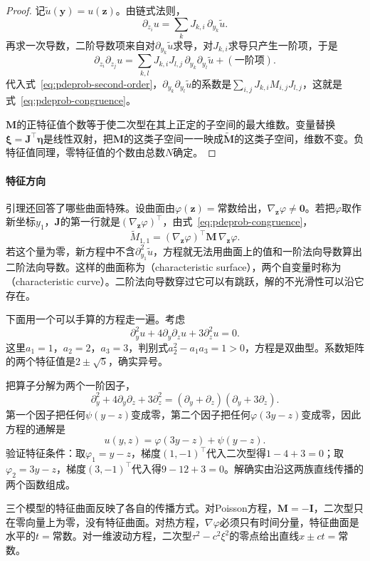 \begin{proof}
记$\widetilde{u}(\bm{y})=u(\bm{z})$。由链式法则，
\[
  \partial_{z_i}u=\sum_{k}J_{k,i}\,\partial_{y_k}\widetilde{u}.
\]
再求一次导数，二阶导数项来自对$\partial_{y_k}\widetilde{u}$求导，对$J_{k,i}$求导只产生一阶项，于是
\[
  \partial_{z_i}\partial_{z_j}u=\sum_{k,l}J_{k,i}J_{l,j}\,\partial_{y_k}\partial_{y_l}\widetilde{u}+(\text{一阶项}).
\]
代入式~\eqref{eq:pdeprob-second-order}，$\partial_{y_k}\partial_{y_l}\widetilde{u}$的系数是$\sum_{i,j}J_{k,i}M_{i,j}J_{l,j}$，这就是式~\eqref{eq:pdeprob-congruence}。

$\bm{M}$的正特征值个数等于使二次型在其上正定的子空间的最大维数。变量替换$\bm{\xi}=\bm{J}^{\top}\bm{\eta}$是线性双射，把$\bm{M}$的这类子空间一一映成$\widetilde{\bm{M}}$的这类子空间，维数不变。负特征值同理，零特征值的个数由总数$N$确定。
\end{proof}

\paragraph{特征方向}
引理还回答了哪些曲面特殊。设曲面由$\varphi(\bm{z})=$常数给出，$\nabla_{\bm{z}}\varphi\neq\bm{0}$。若把$\varphi$取作新坐标$y_1$，$\bm{J}$的第一行就是$(\nabla_{\bm{z}}\varphi)^{\top}$，由式~\eqref{eq:pdeprob-congruence}，
\[
  \widetilde{M}_{1,1}=(\nabla_{\bm{z}}\varphi)^{\top}\bm{M}\,\nabla_{\bm{z}}\varphi.
\]
若这个量为零，新方程中不含$\partial_{y_1}^{2}\widetilde{u}$，方程就无法用曲面上的值和一阶法向导数算出二阶法向导数。这样的曲面称为（characteristic surface），两个自变量时称为（characteristic curve）。二阶法向导数穿过它可以有跳跃，解的不光滑性可以沿它存在。

下面用一个可以手算的方程走一遍。考虑
\[
  \partial_y^{2}u+4\partial_y\partial_zu+3\partial_z^{2}u=0.
\]
这里$a_1=1$，$a_2=2$，$a_3=3$，判别式$a_2^{2}-a_1a_3=1>0$，方程是双曲型。系数矩阵的两个特征值是$2\pm\sqrt{5}$，确实异号。

把算子分解为两个一阶因子，
\[
  \partial_y^{2}+4\partial_y\partial_z+3\partial_z^{2}=(\partial_y+\partial_z)(\partial_y+3\partial_z).
\]
第一个因子把任何$\psi(y-z)$变成零，第二个因子把任何$\varphi(3y-z)$变成零，因此方程的通解是
\[
  u(y,z)=\varphi(3y-z)+\psi(y-z).
\]
验证特征条件：取$\varphi_1=y-z$，梯度$(1,-1)^{\top}$代入二次型得$1-4+3=0$；取$\varphi_2=3y-z$，梯度$(3,-1)^{\top}$代入得$9-12+3=0$。解确实由沿这两族直线传播的两个函数组成。

三个模型的特征曲面反映了各自的传播方式。对Poisson方程，$\bm{M}=-\bm{I}$，二次型只在零向量上为零，没有特征曲面。对热方程，$\nabla\varphi$必须只有时间分量，特征曲面是水平的$t=$常数。对一维波动方程，二次型$\tau^{2}-c^{2}\xi^{2}$的零点给出直线$x\pm ct=$常数。

